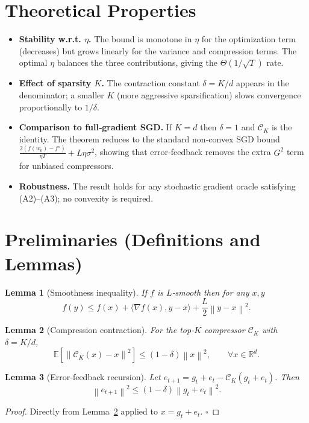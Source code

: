 \documentclass{article}
\newtheorem{lemma}{Lemma}
\newcommand{\E}{\mathbb{E}}
\newcommand{\R}{\mathbb{R}}
\newcommand{\norm}[1]{\left\|#1\right\|}
\newcommand{\topk}{\mathcal{C}_{K}}
\begin{document}
\section*{Theoretical Properties}
\begin{itemize}
\item \textbf{Stability w.r.t. $\eta$.} The bound is monotone in $\eta$ for the
optimization term (decreases) but grows linearly for the variance and compression
terms. The optimal $\eta$ balances the three contributions, giving the
$\Theta(1/\sqrt{T})$ rate.

\item \textbf{Effect of sparsity $K$.} The contraction constant $\delta=K/d$
appears in the denominator; a smaller $K$ (more aggressive sparsification) slows
convergence proportionally to $1/\delta$.

\item \textbf{Comparison to full‑gradient SGD.}
If $K=d$ then $\delta=1$ and $\topk$ is the identity. The theorem reduces to the
standard non‑convex SGD bound
$\frac{2(f(w_{0})-f^{\star})}{\eta T}+L\eta\sigma^{2}$,
showing that error‑feedback removes the extra $G^{2}$ term for unbiased
compressors.

\item \textbf{Robustness.} The result holds for any stochastic gradient oracle
satisfying (A2)–(A3); no convexity is required.
\end{itemize}

\section*{Preliminaries (Definitions and Lemmas)}
\begin{lemma}[Smoothness inequality]\label{lem:smooth}
If $f$ is $L$‑smooth then for any $x,y$
\[
f(y)\le f(x)+\langle\nabla f(x),y-x\rangle+\frac{L}{2}\norm{y-x}^{2}.
\]
\end{lemma}

\begin{lemma}[Compression contraction]\label{lem:compress}
For the top‑$K$ compressor $\topk$ with $\delta=K/d$,
\[
\E\!\left[\norm{\topk(x)-x}^{2}\right]\le (1-\delta)\norm{x}^{2},
\qquad\forall x\in\R^{d}.
\]
\end{lemma}

\begin{lemma}[Error‑feedback recursion]\label{lem:error}
Let $e_{t+1}=g_{t}+e_{t}-\topk(g_{t}+e_{t})$. Then
\[
\norm{e_{t+1}}^{2}\le (1-\delta)\norm{g_{t}+e_{t}}^{2}.
\]
\end{lemma}
\begin{proof}
Directly from Lemma~\ref{lem:compress} applied to $x=g_{t}+e_{t}$. $\square$
\end{proof}
\end{document}
